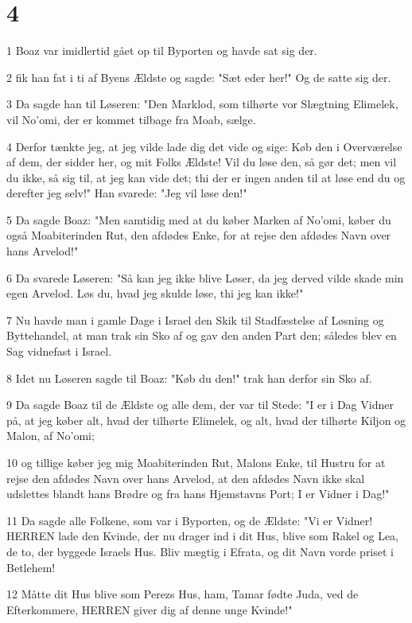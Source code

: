 \chapter{4}

\par 1 Boaz var imidlertid gået op til Byporten og havde sat sig der.
\par 2 fik han fat i ti af Byens Ældste og sagde: "Sæt eder her!" Og de satte sig der.
\par 3 Da sagde han til Løseren: "Den Marklod, som tilhørte vor Slægtning Elimelek, vil No'omi, der er kommet tilbage fra Moab, sælge.
\par 4 Derfor tænkte jeg, at jeg vilde lade dig det vide og sige: Køb den i Overværelse af dem, der sidder her, og mit Folks Ældste! Vil du løse den, så gør det; men vil du ikke, så sig til, at jeg kan vide det; thi der er ingen anden til at løse end du og derefter jeg selv!" Han svarede: "Jeg vil løse den!"
\par 5 Da sagde Boaz: "Men samtidig med at du køber Marken af No'omi, køber du også Moabiterinden Rut, den afdødes Enke, for at rejse den afdødes Navn over hans Arvelod!"
\par 6 Da svarede Løseren: "Så kan jeg ikke blive Løser, da jeg derved vilde skade min egen Arvelod. Løs du, hvad jeg skulde løse, thi jeg kan ikke!"
\par 7 Nu havde man i gamle Dage i Israel den Skik til Stadfæstelse af Løsning og Byttehandel, at man trak sin Sko af og gav den anden Part den; således blev en Sag vidnefast i Israel.
\par 8 Idet nu Løseren sagde til Boaz: "Køb du den!" trak han derfor sin Sko af.
\par 9 Da sagde Boaz til de Ældste og alle dem, der var til Stede: "I er i Dag Vidner på, at jeg køber alt, hvad der tilhørte Elimelek, og alt, hvad der tilhørte Kiljon og Malon, af No'omi;
\par 10 og tillige køber jeg mig Moabiterinden Rut, Malons Enke, til Hustru for at rejse den afdødes Navn over hans Arvelod, at den afdødes Navn ikke skal udslettes blandt hans Brødre og fra hans Hjemstavns Port; I er Vidner i Dag!"
\par 11 Da sagde alle Folkene, som var i Byporten, og de Ældste: "Vi er Vidner! HERREN lade den Kvinde, der nu drager ind i dit Hus, blive som Rakel og Lea, de to, der byggede Israels Hus. Bliv mægtig i Efrata, og dit Navn vorde priset i Betlehem!
\par 12 Måtte dit Hus blive som Perezs Hus, ham, Tamar fødte Juda, ved de Efterkommere, HERREN giver dig af denne unge Kvinde!"
